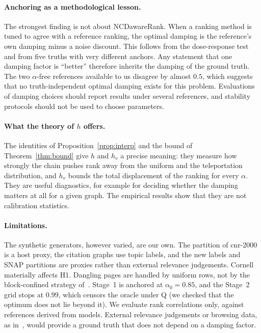 \documentclass[11pt,a4paper]{article}
\theoremstyle{definition}
\theoremstyle{remark}
\begin{document}
\paragraph{Anchoring as a methodological lesson.} The strongest finding is not about NCDawareRank. When a
ranking method is tuned to agree with a reference ranking, the optimal damping is the reference's own
damping minus a noise discount. This follows from the dose-response test and from five truths with
very different anchors. Any statement that one damping factor is ``better'' therefore inherits the
damping of the ground truth. The two $\alpha$-free references available to us disagree by almost
$0.5$, which suggests that no truth-independent optimal damping exists for this problem. Evaluations
of damping choices should report results under several references, and stability protocols should not
be used to choose parameters.

\paragraph{What the theory of $h$ offers.} The identities of Proposition~\ref{prop:interp} and the bound
of Theorem~\ref{thm:bound} give $h$ and $h_v$ a precise meaning: they measure how strongly the chain
pushes rank away from the uniform and the teleportation distribution, and $h_v$ bounds the total
displacement of the ranking for every $\alpha$. They are useful diagnostics, for example for deciding
whether the damping matters at all for a given graph. The empirical results show that they are not
calibration statistics.

\paragraph{Limitations.} The synthetic generators, however varied, are our own. The partition of
cnr-2000 is a host proxy, the citation graphs use topic labels, and the new labels and SNAP partitions
are proxies rather than external relevance judgements. Cornell materially affects H1. Dangling pages are handled
by uniform rows, not by the block-confined strategy of~\cite{ng20}. Stage~1 is anchored at
$\alpha_0=0.85$, and the Stage~2 grid stops at $0.99$, which censors the oracle under Q (we checked that
the optimum does not lie beyond it). We evaluate rank correlations only, against references derived from
models. External relevance judgements or browsing data, as in~\cite{gleich10}, would provide a ground
truth that does not depend on a damping factor.
\end{document}
